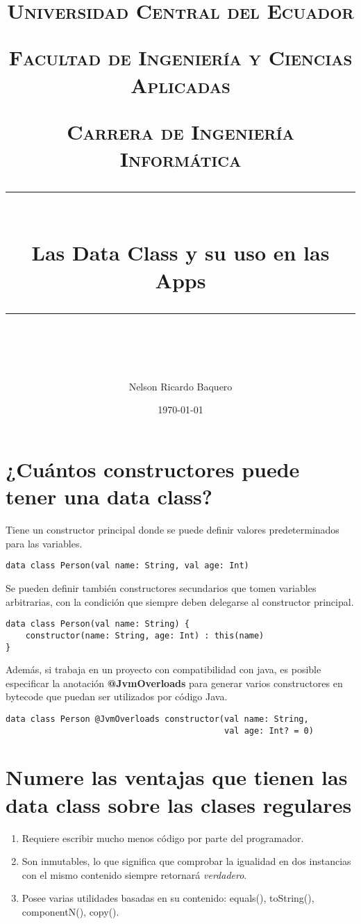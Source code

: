 \documentclass[11pt]{scrartcl} %
\title{	
	\normalfont\normalsize
	\textsc{Universidad Central del Ecuador}

	\textsc{Facultad de Ingeniería y Ciencias Aplicadas}

	\textsc{Carrera de Ingeniería Informática}
	\vspace{6pt} %
	\rule{\linewidth}{0.5pt}\\ %
	\vspace{20pt} %
	{\huge Las Data Class y su uso en las Apps}\\ %
	\vspace{12pt} %
	\rule{\linewidth}{2pt}\\ %
	\vspace{12pt} %
}
\author{\LARGE Nelson Ricardo Baquero} %
\date{\normalsize\today} %
\begin{document}
\maketitle %


\section{¿Cuántos constructores puede tener una data class?}

Tiene un constructor principal donde se puede definir valores predeterminados para las variables.

\begin{lstlisting}
data class Person(val name: String, val age: Int)
\end{lstlisting}

Se pueden definir también constructores secundarios que tomen variables arbitrarias, con la condición que siempre deben delegarse al constructor principal.

\begin{lstlisting}
data class Person(val name: String) {
    constructor(name: String, age: Int) : this(name)
}
\end{lstlisting}

Además, si trabaja en un proyecto con compatibilidad con java, es posible especificar la anotación \textbf{@JvmOverloads} para generar varios constructores en bytecode que puedan ser utilizados por código Java.

\begin{lstlisting}
data class Person @JvmOverloads constructor(val name: String, 
                                            val age: Int? = 0)
\end{lstlisting}


\section{Numere las ventajas que tienen las data class sobre las clases regulares}

\begin{enumerate}
	\item Requiere escribir mucho menos código por parte del programador.
	\item Son inmutables, lo que significa que comprobar la igualidad en dos instancias con el mismo contenido siempre retornará \emph{verdadero}.
	\item Posee varias utilidades basadas en su contenido: equals(), toString(), componentN(), copy().
\end{enumerate}
\end{document}
